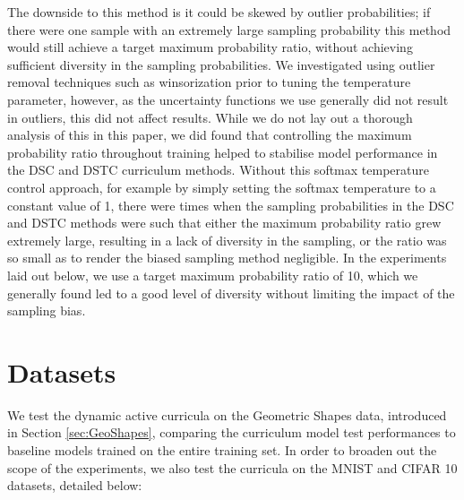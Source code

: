 The downside to this method is it could be skewed by outlier probabilities; if there were one sample with an extremely large sampling probability this method would still achieve a target maximum probability ratio, without achieving sufficient diversity in the sampling probabilities. We investigated using outlier removal techniques such as winsorization \cite{ghosh2012outliers} prior to tuning the temperature parameter, however, as the uncertainty  functions we use generally did not result in outliers, this did not affect results. While we do not lay out a thorough analysis of this in this paper, we did found that controlling the maximum probability ratio throughout training helped to stabilise model performance in the DSC and DSTC curriculum methods. Without this softmax temperature control approach, for example by simply setting the softmax temperature to a constant value of 1, there were times when the sampling probabilities in the DSC and DSTC methods were such that either the maximum probability ratio grew extremely large, resulting in a lack of diversity in the sampling, or the ratio was so small as to render the biased sampling method negligible. In the experiments laid out below, we use a target maximum probability ratio of 10, which we generally found led to a good level of diversity without limiting the impact of the sampling bias.

\section{Datasets}
We test the dynamic active curricula on the Geometric Shapes data, introduced in Section \ref{sec:GeoShapes}, comparing the curriculum model test performances to baseline models trained on the entire training set. In order to broaden out the scope of the experiments, we also test the curricula on the MNIST \cite{lecun-mnisthandwrittendigit-2010} and CIFAR 10 \cite{krizhevsky2009learning} datasets, detailed below:
